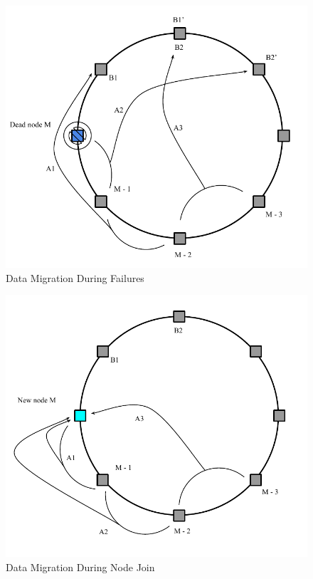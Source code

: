 \documentclass[10pt,twocolumn,letterpaper]{article}
\begin{document}
\begin{figure}[hbt]
  \centering
  \includegraphics[scale=0.6]{handle_dead.pdf}
  \caption{Data Migration During Failures}
  \label{handledead}
\end{figure}


\begin{figure}[hbt]
  \centering
  \includegraphics[scale=0.6]{handle_join.pdf}
  \caption{Data Migration During Node Join}
  \label{handlejoin}
\end{figure}
\end{document}
